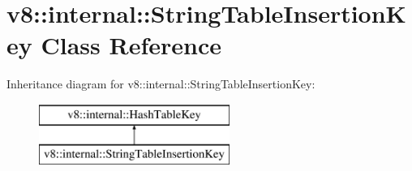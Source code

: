 \hypertarget{classv8_1_1internal_1_1_string_table_insertion_key}{}\section{v8\+:\+:internal\+:\+:String\+Table\+Insertion\+Key Class Reference}
\label{classv8_1_1internal_1_1_string_table_insertion_key}
Inheritance diagram for v8\+:\+:internal\+:\+:String\+Table\+Insertion\+Key\+:\begin{figure}[H]
\begin{center}
\leavevmode
\includegraphics[height=2.000000cm]{classv8_1_1internal_1_1_string_table_insertion_key}
\end{center}
\end{figure}
